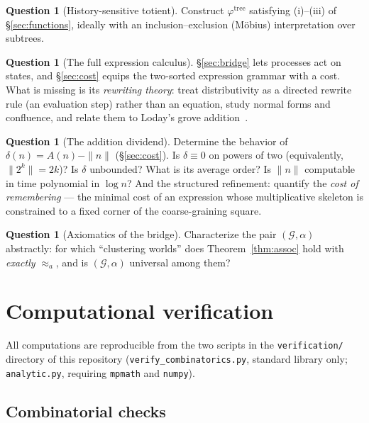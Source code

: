 \documentclass[11pt]{article}
\newcommand{\cG}{\mathcal{G}}   %
\numberwithin{equation}{section}
\theoremstyle{plain}
\theoremstyle{definition}
\newtheorem{question}[theorem]{Question}
\theoremstyle{remark}
\begin{document}
\begin{question}[History-sensitive totient]\label{prob:totient}
Construct $\varphi^{\mathrm{tree}}$ satisfying (i)--(iii) of \S\ref{sec:functions},
ideally with an inclusion--exclusion (M\"obius) interpretation over subtrees.
\end{question}

\begin{question}[The full expression calculus]\label{prob:calculus}
\S\ref{sec:bridge} lets processes act on states, and \S\ref{sec:cost} equips the
two-sorted expression grammar with a cost. What is missing is its \emph{rewriting
theory}: treat distributivity as a directed rewrite rule (an evaluation step) rather
than an equation, study normal forms and confluence, and relate them to Loday's grove
addition~\cite{loday,brunoyasaki}.
\end{question}

\begin{question}[The addition dividend]\label{prob:cost}
Determine the behavior of $\delta(n) = A(n) - \|n\|$ (\S\ref{sec:cost}). Is
$\delta \equiv 0$ on powers of two (equivalently, $\|2^k\| = 2k$)? Is $\delta$
unbounded? What is its average order? Is $\|n\|$ computable in time polynomial in
$\log n$? And the structured refinement: quantify the \emph{cost of remembering} ---
the minimal cost of an expression whose multiplicative skeleton is constrained to a
fixed corner of the coarse-graining square.
\end{question}

\begin{question}[Axiomatics of the bridge]\label{prob:axioms}
Characterize the pair $(\cG, \alpha)$ abstractly: for which ``clustering worlds'' does
Theorem~\ref{thm:assoc} hold with \emph{exactly} $\approx_a$, and is $(\cG,\alpha)$
universal among them?
\end{question}

\appendix
\section{Computational verification}\label{app:verification}

All computations are reproducible from the two scripts in the \texttt{verification/}
directory of this repository (\texttt{verify\_combinatorics.py}, standard library
only; \texttt{analytic.py}, requiring \texttt{mpmath} and \texttt{numpy}).

\subsection{Combinatorial checks}
\end{document}
